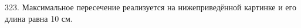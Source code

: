 323. Максимальное пересечение реализуется на нижеприведённой картинке и его длина равна 10 см.\\
\begin{figure}[ht!]
\end{figure}\\
